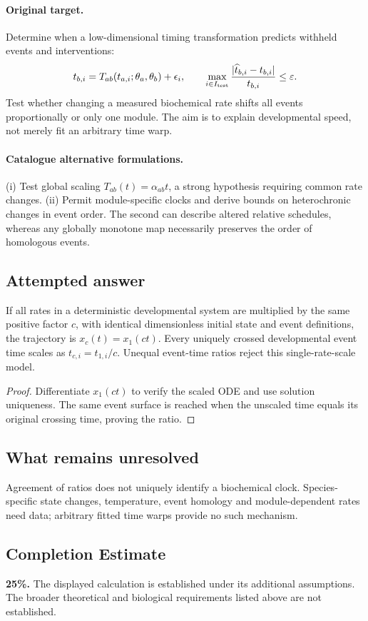 \documentclass[11pt]{article}
\begin{document}
\paragraph{Original target.}
Determine when a low-dimensional timing transformation predicts withheld events and interventions:
\[
 t_{b,i}=T_{ab}(t_{a,i};\theta_a,\theta_b)+\epsilon_i,
\qquad
\max_{i\in I_{\rm test}}\frac{|\widehat t_{b,i}-t_{b,i}|}{t_{b,i}}\leq\varepsilon.
\]
Test whether changing a measured biochemical rate shifts all events proportionally or only one module. The aim is to explain developmental speed, not merely fit an arbitrary time warp.
\paragraph{Catalogue alternative formulations.}
(i) Test global scaling $T_{ab}(t)=\alpha_{ab}t$, a strong hypothesis requiring common rate changes. (ii) Permit module-specific clocks and derive bounds on heterochronic changes in event order. The second can describe altered relative schedules, whereas any globally monotone map necessarily preserves the order of homologous events.
\subsection{Attempted answer}
\begin{proposition}
If all rates in a deterministic developmental system are multiplied by the same positive factor $c$, with identical dimensionless initial state and event definitions, the trajectory is $x_c(t)=x_1(ct)$. Every uniquely crossed developmental event time scales as $t_{c,i}=t_{1,i}/c$. Unequal event-time ratios reject this single-rate-scale model.
\end{proposition}
\begin{proof}
Differentiate $x_1(ct)$ to verify the scaled ODE and use solution uniqueness. The same event surface is reached when the unscaled time equals its original crossing time, proving the ratio.
\end{proof}
\subsection{What remains unresolved}
Agreement of ratios does not uniquely identify a biochemical clock. Species-specific state changes, temperature, event homology and module-dependent rates need data; arbitrary fitted time warps provide no such mechanism.
\subsection{Completion Estimate}
\textbf{25\%.} The displayed calculation is established under its additional assumptions. The broader theoretical and biological requirements listed above are not established.
\end{document}
